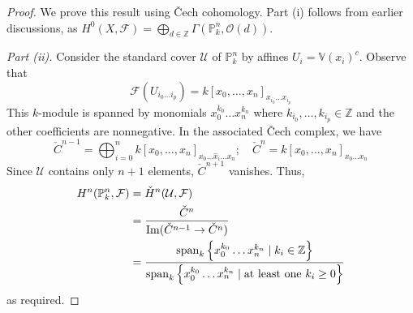 \begin{proof}
	We prove this result using \v{C}ech cohomology.
	Part (i) follows from earlier discussions, as \( H^0(X, \mathcal F) = \bigoplus_{d \in \mathbb Z} \Gamma(\mathbb P^n_k, \mathcal O(d)) \).

	\emph{Part (ii).}
	Consider the standard cover \( \mathcal U \) of \( \mathbb P^n_k \) by affines \( U_i = \mathbb V(x_i)^c \).
	Observe that
	\[ \mathcal F(U_{i_0 \dots i_p}) = k[x_0, \dots, x_n]_{x_{i_0} \dots x_{i_p}} \]
	This \( k \)-module is spanned by monomials \( x_0^{k_0} \dots x_n^{k_n} \) where \( k_{i_0}, \dots, k_{i_p} \in \mathbb Z \) and the other coefficients are nonnegative.
	In the associated \v{C}ech complex, we have
	\[ \check{C}^{n-1} = \bigoplus_{i=0}^n k[x_0, \dots, x_n]_{x_0 \dots \hat x_i \dots x_n};\quad \check{C}^n = k[x_0, \dots, x_n]_{x_0 \dots x_n} \]
	Since \( \mathcal U \) contains only \( n + 1 \) elements, \( \check{C}^{n+1} \) vanishes.
	Thus,
	\begin{align*}
		H^n(\mathbb P^n_k, \mathcal F) &= \check{H}^n(\mathcal U, \mathcal F) \\
		&= \frac{\check{C}^n}{\operatorname{Im} (\check{C}^{n-1} \to \check{C}^n)} \\
		&= \frac{\operatorname{span}_k \qty{x_0^{k_0} \dots x_n^{k_n} \mid k_i \in \mathbb Z}}{\operatorname{span}_k \qty{x_0^{k_0} \dots x_n^{k_n} \mid \text{at least one } k_i \geq 0}}
	\end{align*}
	as required.


\end{proof}
